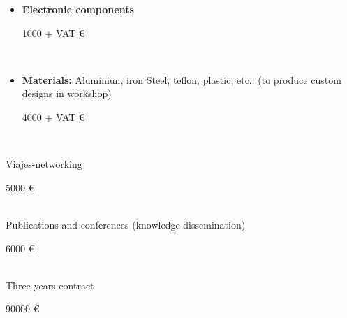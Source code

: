 \begin{itemize}
\item \textbf{Electronic components}                                                                                      {\raggedright  1000 + VAT \euro} \\
\item \textbf{Materials:} Aluminiun, iron Steel, teflon, plastic, etc.. (to produce custom designs in workshop)                                                                               {\raggedright   4000 + VAT \euro} \\

\end{itemize}

Viajes-networking {\raggedright 5000  \euro} \\
Publications and conferences (knowledge dissemination)            {\raggedright 6000  \euro} \\


Three years contract  {\raggedright 90000  \euro} \\

